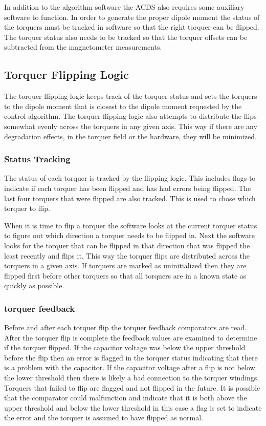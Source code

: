 In addition to the algorithm software the \ac{ACDS} also requires some auxiliary software to function. In order to generate the proper dipole moment the status of the torquers must be tracked in software so that the right torquer can be flipped. The torquer status also needs to be tracked so that the torquer offsets can be subtracted from the magnetometer measurements. 

\subsection{Torquer Flipping Logic}

The torquer flipping logic keeps track of the torquer status and sets the torquers to the dipole moment that is closest to the dipole moment requested by the control algorithm. The torquer flipping logic also attempts to distribute the flips somewhat evenly across the torquers in any given axis. This way if there are any degradation effects, in the torquer field or the hardware, they will be minimized. 

\subsubsection{Status Tracking}

The status of each torquer is tracked by the flipping logic. This includes flags to indicate if each torquer has been flipped and has had errors being flipped. The last four torquers that were flipped are also tracked. This is used to chose which torquer to flip.

When it is time to flip a torquer the software looks at the current torquer status to figure out which direction a torquer needs to be flipped in. Next the software looks for the torquer that can be flipped in that direction that was flipped the least recently and flips it. This way the torquer flips are distributed across the torquers in a given axis. If torquers are marked as uninitialized then they are flipped first before other torquers so that all torquers are in a known state as quickly as possible.

\subsubsection{torquer feedback}

Before and after each torquer flip the torquer feedback comparators are read. After the torquer flip is complete the feedback values are examined to determine if the torquer flipped. If the capacitor voltage was below the upper threshold before the flip then an error is flagged in the torquer status indicating that there is a problem with the capacitor. If the capacitor voltage after a flip is not below the lower threshold then there is likely a bad connection to the torquer windings. Torquers that failed to flip are flagged and not flipped in the future. It is possible that the comparator could malfunction and indicate that it is both above the upper threshold and below the lower threshold in this case a flag is set to indicate the error and the torquer is assumed to have flipped as normal.

